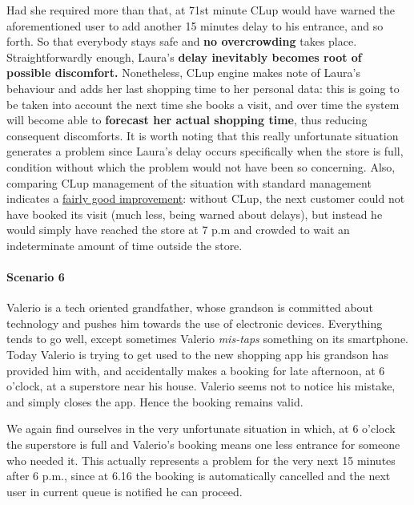 Had she required more than that, at 71st minute CLup would have warned the aforementioned user to add another 15 minutes delay to his entrance, and so forth. So that everybody stays safe and \textbf{no overcrowding} takes place.\newline
Straightforwardly enough, Laura's \textbf{delay inevitably becomes root of possible discomfort.} Nonetheless, CLup engine makes note of Laura's behaviour and adds her last shopping time to her personal data: this is going to be taken into account the next time she books a visit, and over time the system will become able to \textbf{forecast her actual shopping time}, thus reducing consequent discomforts.\newline
It is worth noting that this really unfortunate situation generates a problem since Laura's delay occurs specifically when the store is full, condition without which the problem would not have been so concerning.\newline
Also, comparing CLup management of the situation with standard management indicates a \underline{fairly good improvement}: without CLup, the next customer could not have booked its visit (much less, being warned about delays), but instead he would simply have reached the store at 7 p.m and crowded to wait an indeterminate amount of time outside the store.

\paragraph{Scenario 6}
Valerio is a tech oriented grandfather, whose grandson is committed about technology and pushes him towards the use of electronic devices.\newline
Everything tends to go well, except sometimes Valerio \textit{mis-taps} something on its smartphone. Today Valerio is trying to get used to the new shopping app his grandson has provided him with, and accidentally makes a booking for late afternoon, at 6 o'clock, at a superstore near his house.\newline
Valerio seems not to notice his mistake, and simply closes the app. Hence the booking remains valid.

We again find ourselves in the very unfortunate situation in which, at 6 o'clock the superstore is full and Valerio's booking means one less entrance for someone who needed it. This actually represents a problem for the very next 15 minutes after 6 p.m., since at 6.16 the booking is automatically cancelled and the next user in current queue is notified he can proceed. 

